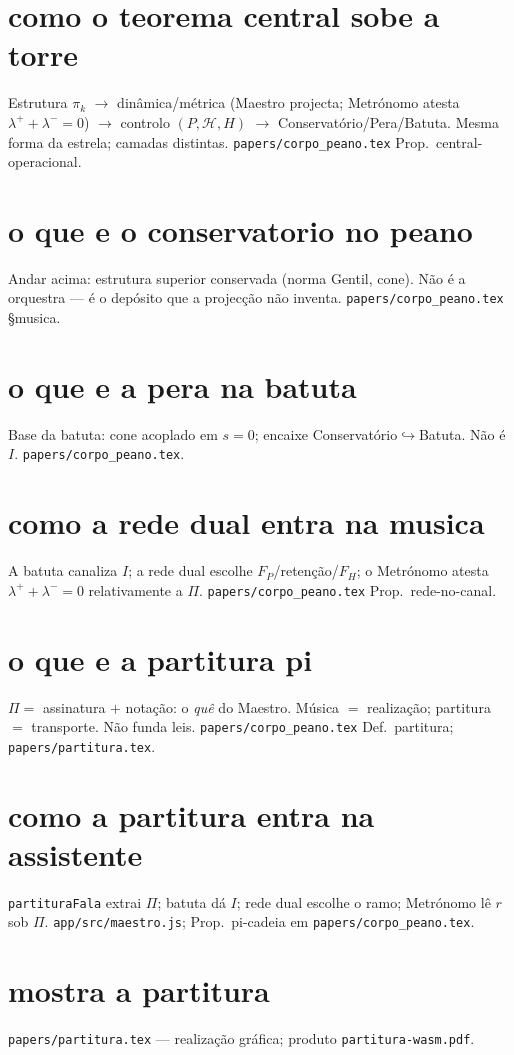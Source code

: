 \documentclass[11pt,a4paper]{article}
\newcommand{\code}[1]{\texttt{\small #1}}
\begin{document}
\section{como o teorema central sobe a torre}
Estrutura $\pi_k$ $\to$ dinâmica/métrica (Maestro projecta; Metrónomo
atesta $\lambda^{+}+\lambda^{-}=0$) $\to$ controlo $(P,\mathcal{H},H)$
$\to$ Conservatório/Pera/Batuta.
Mesma forma da estrela; camadas distintas.
\code{papers/corpo\_peano.tex} Prop.\ central-operacional.

\section{o que e o conservatorio no peano}
Andar acima: estrutura superior conservada (norma Gentil, cone).
Não é a orquestra --- é o depósito que a projecção não inventa.
\code{papers/corpo\_peano.tex} \S musica.

\section{o que e a pera na batuta}
Base da batuta: cone acoplado em $s=0$; encaixe
Conservatório$\hookrightarrow$Batuta. Não é $I$.
\code{papers/corpo\_peano.tex}.

\section{como a rede dual entra na musica}
A batuta canaliza $I$; a rede dual escolhe $F_P$/retenção/$F_H$;
o Metrónomo atesta $\lambda^{+}+\lambda^{-}=0$ relativamente a $\Pi$.
\code{papers/corpo\_peano.tex} Prop.\ rede-no-canal.

\section{o que e a partitura pi}
$\Pi=$ assinatura $+$ notação: o \emph{quê} do Maestro.
Música $=$ realização; partitura $=$ transporte. Não funda leis.
\code{papers/corpo\_peano.tex} Def.\ partitura; \code{papers/partitura.tex}.

\section{como a partitura entra na assistente}
\code{partituraFala} extrai $\Pi$; batuta dá $I$; rede dual escolhe o ramo;
Metrónomo lê $r$ sob $\Pi$.
\code{app/src/maestro.js}; Prop.\ pi-cadeia em \code{papers/corpo\_peano.tex}.

\section{mostra a partitura}
\code{papers/partitura.tex} --- realização gráfica; produto
\code{partitura-wasm.pdf}.
\end{document}
